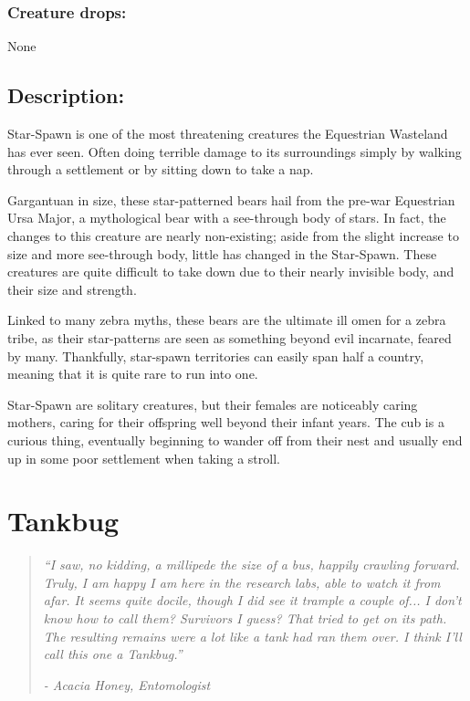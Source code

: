\documentclass[11pt,a4paper,twocolumn]{book}
\begin{document}
	\subsubsection*{Creature drops:}
	None
	
	\subsection*{Description:}
	Star-Spawn is one of the most threatening creatures the Equestrian Wasteland has ever seen. Often doing terrible damage to its surroundings simply by walking through a settlement or by sitting down to take a nap.
	
	Gargantuan in size, these star-patterned bears hail from the pre-war Equestrian Ursa Major, a mythological bear with a see-through body of stars. In fact, the changes to this creature are nearly non-existing; aside from the slight increase to size and more see-through body, little has changed in the Star-Spawn. These creatures are quite difficult to take down due to their nearly invisible body, and their size and strength.
	
	Linked to many zebra myths, these bears are the ultimate ill omen for a zebra tribe, as their star-patterns are seen as something beyond evil incarnate, feared by many. Thankfully, star-spawn territories can easily span half a country, meaning that it is quite rare to run into one.
	
	Star-Spawn are solitary creatures, but their females are noticeably caring mothers, caring for their offspring well beyond their infant years. The cub is a curious thing, eventually beginning to wander off from their nest and usually end up in some poor settlement when taking a stroll.
	
	\clearpage
	
	\section*{Tankbug}
	\begin{quote}
		\emph{``I saw, no kidding, a millipede the size of a bus, happily crawling forward. Truly, I am happy I am here in the research labs, able to watch it from afar. It seems quite docile, though I did see it trample a couple of... I don't know how to call them? Survivors I guess? That tried to get on its path. The resulting remains were a lot like a tank had ran them over. I think I'll call this one a Tankbug.''}
		
		\emph{-	Acacia Honey, Entomologist}
	\end{quote}
	
\end{document}
